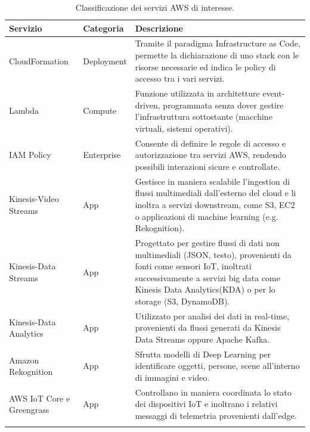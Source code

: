 \begin{longtable}{@{}p{3cm}p{2.5cm}p{7cm}@{}}
\toprule
\textbf{Servizio} & \textbf{Categoria} & \textbf{Descrizione} \\ \midrule
\endfirsthead

\endhead

CloudFormation & Deployment & Tramite il paradigma Infrastructure as Code, permette la dichiarazione di uno stack con le risorse necessarie ed indica le policy di accesso tra i vari servizi. \\ \midrule
Lambda & Compute & Funzione utilizzata in architetture event-driven, programmata senza dover gestire l'infrastruttura sottostante (macchine virtuali, sistemi operativi). \\ \midrule
IAM Policy & Enterprise & Consente di definire le regole di accesso e autorizzazione tra servizi AWS, rendendo possibili interazioni sicure e controllate. \\ \midrule
Kinesis-Video Streams & App & Gestisce in maniera scalabile l'ingestion di flussi multimediali dall'esterno del cloud e li inoltra a servizi downstream, come S3, EC2 o applicazioni di machine learning (e.g. Rekognition). \\ \midrule
Kinesis-Data Streams & App & Progettato per gestire flussi di dati non multimediali (JSON, testo), provenienti da fonti come sensori IoT, inoltrati successivamente a servizi big data come Kinesis Data Analytics(KDA) o per lo storage (S3, DynamoDB). \\ \midrule   
Kinesis-Data Analytics & App & Utilizzato per analisi dei dati in real-time, provenienti da flussi generati da Kinesis Data Streams oppure Apache Kafka. \\ \midrule
Amazon Rekognition & App & Sfrutta modelli di Deep Learning per identificare oggetti, persone, scene all'interno di immagini e video. \\ \midrule
AWS IoT Core e Greengrass & App & Controllano in maniera coordinata lo stato dei dispositivi IoT e inoltrano i relativi messaggi di telemetria provenienti dall'edge. \\ \bottomrule
\caption{Classificazione dei servizi AWS di interesse.} \label{tab:aws_services}
\end{longtable}

